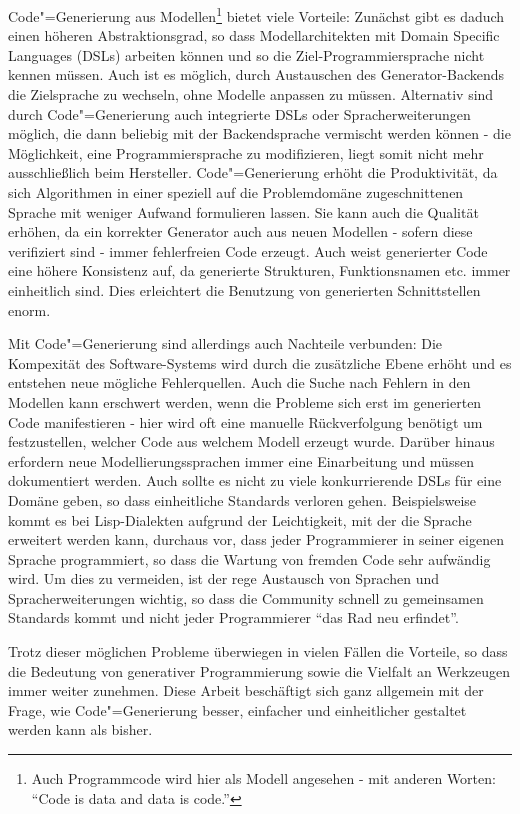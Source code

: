 \documentclass[11pt, a4paper, bibgerm]{book}
\newcommand{\cgen}{Code"=Generierung}
\begin{document}
\cgen{} aus Modellen\footnote{Auch Programmcode wird hier als Modell
  angesehen - mit anderen Worten: "`Code is data and data is code."'}
bietet viele Vorteile: Zunächst gibt es daduch einen höheren
Abstraktionsgrad, so dass Modellarchitekten mit Domain Specific
Languages (DSLs) arbeiten können und so die Ziel-Programmiersprache
nicht kennen müssen. Auch ist es möglich, durch Austauschen des
Generator-Backends die Zielsprache zu wechseln, ohne Modelle anpassen zu
müssen. Alternativ sind durch \cgen{} auch integrierte DSLs oder
Spracherweiterungen möglich, die dann beliebig mit der Backendsprache
vermischt werden können - die Möglichkeit, eine Programmiersprache zu
modifizieren, liegt somit nicht mehr ausschließlich beim
Hersteller. \cgen{} erhöht die Produktivität, da sich Algorithmen in
einer speziell auf die Problemdomäne zugeschnittenen Sprache mit weniger
Aufwand formulieren lassen. Sie kann auch die Qualität erhöhen, da ein
korrekter Generator auch aus neuen Modellen - sofern diese verifiziert
sind - immer fehlerfreien Code erzeugt. Auch weist generierter Code eine
höhere Konsistenz auf, da generierte Strukturen, Funktionsnamen
etc. immer einheitlich sind. Dies erleichtert die Benutzung von
generierten Schnittstellen enorm.

Mit \cgen{} sind allerdings auch Nachteile verbunden: Die Kompexität des
Software-Systems wird durch die zusätzliche Ebene erhöht und es
entstehen neue mögliche Fehlerquellen. Auch die Suche nach Fehlern in
den Modellen kann erschwert werden, wenn die Probleme sich erst im
generierten Code manifestieren - hier wird oft eine manuelle
Rückverfolgung benötigt um festzustellen, welcher Code aus welchem
Modell erzeugt wurde. Darüber hinaus erfordern neue
Modellierungssprachen immer eine Einarbeitung und müssen dokumentiert
werden. Auch sollte es nicht zu viele konkurrierende DSLs für eine
Domäne geben, so dass einheitliche Standards verloren
gehen. Beispielsweise kommt es bei Lisp\cite{TODO}-Dialekten aufgrund
der Leichtigkeit, mit der die Sprache erweitert werden kann, durchaus
vor, dass jeder Programmierer in seiner eigenen Sprache programmiert, so
dass die Wartung von fremden Code sehr aufwändig wird. Um dies zu
vermeiden, ist der rege Austausch von Sprachen und Spracherweiterungen
wichtig, so dass die Community schnell zu gemeinsamen Standards kommt
und nicht jeder Programmierer "`das Rad neu erfindet"'.

Trotz dieser möglichen Probleme überwiegen in vielen Fällen die
Vorteile, so dass die Bedeutung von generativer Programmierung sowie die
Vielfalt an Werkzeugen immer weiter zunehmen. Diese Arbeit beschäftigt
sich ganz allgemein mit der Frage, wie \cgen{} besser, einfacher und
einheitlicher gestaltet werden kann als bisher.
\end{document}
